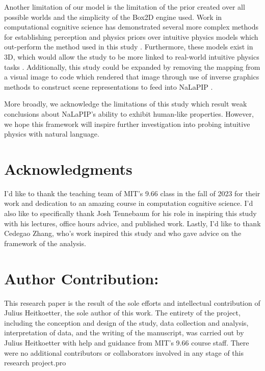 \documentclass[10pt,letterpaper]{article}
\begin{document}
Another limitation of our model is the limitation of the prior created over all possible worlds and the simplicity of the Box2D engine used. Work in computational cognitive science has demonstrated several more complex methods for establishing perception and physics priors over intuitive physics models which out-perform the method used in this study \cite{smith2024intuitive}. Furthermore, these models exist in 3D, which would allow the study to be more linked to real-world intuitive physics tasks \cite{xue20233d}. Additionally, this study could be expanded by removing the mapping from a visual image to code which rendered that image through use of inverse graphics methods to construct scene representations to feed into NaLaPIP \cite{yi2018neural}. 

More broadly, we acknowledge the limitations of this study which result weak conclusions about NaLaPIP's ability to exhibit human-like properties. However, we hope this framework will inspire further investigation into probing intuitive physics with natural language. 

\section{Acknowledgments}

I'd like to thank the teaching team of MIT's 9.66 class in the fall of 2023 for their work and dedication to an amazing course in computation cognitive science. I'd also like to specifically thank Josh Tennebaum for his role in inspiring this study with his lectures, office hours advice, and published work. Lastly, I'd like to thank Cedegao Zhang, who's work inspired this study and who gave advice on the framework of the analysis. 

\section{Author Contribution:}

This research paper is the result of the sole efforts and intellectual contribution of Julius Heitkoetter, the sole author of this work. The entirety of the project, including the conception and design of the study, data collection and analysis, interpretation of data, and the writing of the manuscript, was carried out by Julius Heitkoetter with help and guidance from MIT's 9.66 course staff. There were no additional contributors or collaborators involved in any stage of this research project.pro



\end{document}
